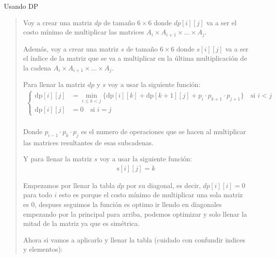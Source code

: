 \textcolor{bibi}{Usando DP}
\begin{quote}
    Voy a crear una matriz $dp$ de tamaño $6 \times 6$ donde $dp[i][j]$ va a ser el costo mínimo de multiplicar las matrices $A_i \times A_{i+1} \times \ldots \times A_j$. \vspace{.2cm}

    Además, voy a crear una matriz $s$ de tamaño $6 \times 6$ donde $s[i][j]$ va a ser el índice de la matriz que se va a multiplicar en la última multiplicación de la cadena $A_i \times A_{i+1} \times \ldots \times A_j$. \vspace{.2cm}

    Para llenar la matriz $dp$ y $s$ voy a usar la siguiente función:
    \begin{align*}
        \begin{cases}
            \text{dp}[i][j] &= \min_{i \leq k < j} \{ \text{dp}[i][k] + \text{dp}[k+1][j] + p_{i} \cdot p_{k+1}\cdot p_{j+1} \} \quad \text{si } i < j \\
            \text{dp}[i][j] &= 0 \quad \text{si } i = j
        \end{cases} \\
    \end{align*}

    Donde $p_{i-1} \cdot p_k \cdot p_j$ es el numero de operaciones que se hacen al multiplicar las matrices resultantes de esas subcadenas. \vspace{.2cm}

    Y para llenar la matriz $s$ voy a usar la siguiente función:
    \begin{align*}
        \text{s}[i][j] = k
    \end{align*}

    Empezamos por llenar la tabla $dp$ por su diagonal, es decir, $dp[i][i] = 0$ para todo $i$ esto es porque el costo mínimo de multiplicar una sola matriz es 0, despues seguimos la función es optimo ir llendo en diagonales empezando por la principal para arriba, podemos optimizar y solo llenar la mitad de la matriz ya que es simétrica. \vspace{.2cm}

    Ahora si vamos a aplicarlo y llenar la tabla (cuidado con confundir indices y elementos): \vspace{.2cm}


\end{quote}

